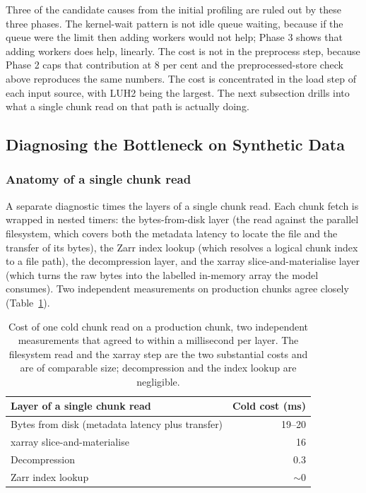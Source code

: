 \documentclass[12pt,a4paper]{article}
\begin{document}
Three of the candidate causes from the initial profiling are ruled out by these three
phases. The kernel-wait pattern is not idle queue waiting, because if the queue were the
limit then adding workers would not help; Phase 3 shows that adding workers does help,
linearly. The cost is not in the preprocess step, because Phase 2 caps that contribution at
8 per cent and the preprocessed-store check above reproduces the same numbers. The cost is
concentrated in the load step of each input source, with LUH2 being the largest. The next subsection
drills into what a single chunk read on that path is actually doing.

\subsection{Diagnosing the Bottleneck on Synthetic Data}

\subsubsection{Anatomy of a single chunk read}

A separate diagnostic times the layers of a single chunk read. Each chunk fetch is wrapped
in nested timers: the bytes-from-disk layer (the read against the parallel filesystem, which
covers both the metadata latency to locate the file and the transfer of its bytes),
the Zarr index lookup (which resolves a logical chunk index to a file path), the
decompression layer, and the xarray slice-and-materialise layer (which turns the raw bytes
into the labelled in-memory array the model consumes). Two independent measurements on
production chunks agree closely (Table~\ref{tab:per-chunk}).

\begin{table}[ht]
\centering
\small
\begin{tabular}{@{}lr@{}}
\toprule
\textbf{Layer of a single chunk read} & \textbf{Cold cost (ms)} \\
\midrule
Bytes from disk (metadata latency plus transfer) & 19--20 \\
xarray slice-and-materialise                         & 16 \\
Decompression                                        & 0.3 \\
Zarr index lookup                                    & ${\sim}0$ \\
\bottomrule
\end{tabular}
\caption{Cost of one cold chunk read on a production chunk, two independent measurements that
agreed to within a millisecond per layer. The filesystem read and the xarray step are the two
substantial costs and are of comparable size; decompression and the index lookup are
negligible.}
\label{tab:per-chunk}
\end{table}
\end{document}
